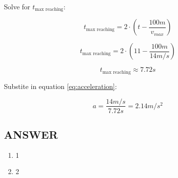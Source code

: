 Solve for $t_{\text{max reaching}}$:

$$t_{\text{max reaching}} = 2 \cdot (t - \frac{100m}{v_{max}})$$

$$t_{\text{max reaching}} = 2 \cdot (11 - \frac{100m}{14m/s})$$

$$t_{\text{max reaching}} \approx 7.72s$$

\newpage Substite in equation \ref{eq:acceleration}:

$$a = \frac{14m/s}{7.72s} = 2.14m/s^2$$


\vfill \subsection*{ANSWER}
\begin{enumerate}
    \item 1
    \item 2
\end{enumerate}
